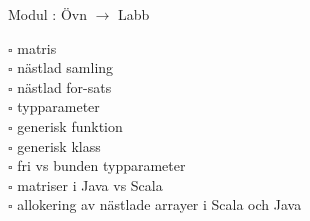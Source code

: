 
    Modul : Övn  $\rightarrow$ Labb 
    \begin{multicols}{3}\SlideFontTiny
    $\square$ matris \\
$\square$ nästlad samling \\
$\square$ nästlad for-sats \\
$\square$ typparameter \\
$\square$ generisk funktion \\
$\square$ generisk klass \\
$\square$ fri vs bunden typparameter \\
$\square$ matriser i Java vs Scala \\
$\square$ allokering av nästlade arrayer i Scala och Java \\
    \end{multicols}
    